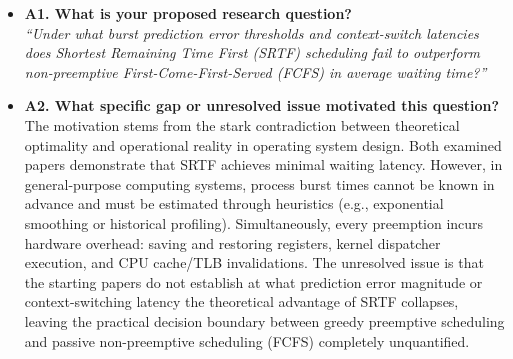 \documentclass[11pt]{article}
\newcommand{\qLabel}[1]{
    {\fontsize{12}{14.4}\selectfont \textbf{#1}}
}
\begin{document}
\vspace{0.8em}
\begin{itemize}[leftmargin=1.5em]

    \item \qLabel{A1. What is your proposed research question?} \\
    \vspace{0.2em}
    \textit{``Under what burst prediction error thresholds and context-switch latencies does Shortest Remaining Time First (SRTF) scheduling fail to outperform non-preemptive First-Come-First-Served (FCFS) in average waiting time?''}

    \vspace{0.8em}
    \item \qLabel{A2. What specific gap or unresolved issue motivated this question?} \\
    \vspace{0.2em}
    The motivation stems from the stark contradiction between theoretical optimality and operational reality in operating system design. Both examined papers demonstrate that SRTF achieves minimal waiting latency. However, in general-purpose computing systems, process burst times cannot be known in advance and must be estimated through heuristics (e.g., exponential smoothing or historical profiling). Simultaneously, every preemption incurs hardware overhead: saving and restoring registers, kernel dispatcher execution, and CPU cache/TLB invalidations. The unresolved issue is that the starting papers do not establish at what prediction error magnitude or context-switching latency the theoretical advantage of SRTF collapses, leaving the practical decision boundary between greedy preemptive scheduling and passive non-preemptive scheduling (FCFS) completely unquantified.


\end{itemize}
\end{document}
